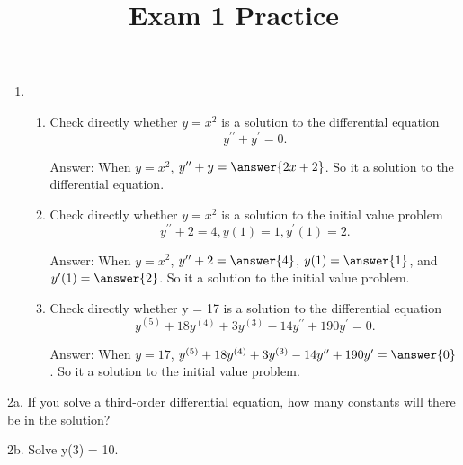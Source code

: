 \documentclass{ximera}
\begin{document}
\title[Math 240:]{Exam 1 Practice}

\begin{enumerate}
	
\item

	\begin{enumerate}[label=\theenumii)]
	
	\item Check directly whether $y = x^2$ is a solution to the differential equation
	$$y^{\prime\prime} + y^\prime = 0.$$
	
	\vfill
	
	Answer: When $y = x^2$, $y^{\prime\prime} + y = \answer{2x+2}$. So it  a solution to the differential equation.
	
	\item Check directly whether $y = x^2$ is a solution to the initial value problem
	$$y^{\prime\prime} + 2 = 4,     y(1) = 1,    y^\prime(1) = 2.$$
	
	\vfill
	
	Answer: When $y = x^2$, $y^{\prime\prime} + 2 = \answer{4}$, $y(1) = \answer{1}$, and $y^\prime(1) = \answer{2}$. So it  a solution to the initial value problem.
	
	\item Check directly whether y = 17 is a solution to the differential equation
	$$y^{(5)} + 18y^{(4)} + 3y^{(3)} -14y^{\prime\prime} + 190y^\prime = 0.$$
	
	\vfill
	
	Answer: When $y = 17$, $y^{(5)} + 18y^{(4)} + 3y^{(3)} -14y^{\prime\prime} + 190y^\prime =  \answer{0}$. So it  a solution to the initial value problem.

	\end{enumerate}

\pagebreak




\end{enumerate}



2a. If you solve a third-order differential equation, how many constants will there be in the solution?










2b. Solve y(3) = 10.
\end{document}
